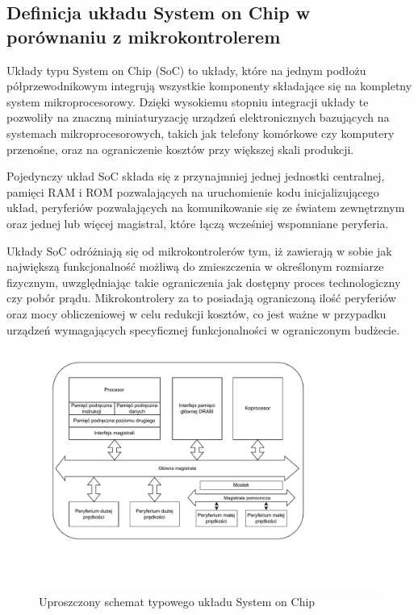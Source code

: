 
\subsection{Definicja układu System on Chip w porównaniu z mikrokontrolerem}

Układy typu System on Chip (SoC) to układy, które na jednym podłożu półprzewodnikowym integrują wszystkie komponenty składające się na kompletny system mikroprocesorowy. Dzięki wysokiemu stopniu integracji układy te pozwoliły na znaczną miniaturyzację urządzeń elektronicznych bazujących na systemach mikroprocesorowych, takich jak telefony komórkowe czy komputery przenośne, oraz na ograniczenie kosztów przy większej skali produkcji.

Pojedynczy układ SoC składa się z przynajmniej jednej jednostki centralnej, pamięci RAM i ROM pozwalających na uruchomienie kodu inicjalizującego układ, peryferiów pozwalających na komunikowanie się ze światem zewnętrznym oraz jednej lub więcej magistral, które łączą wcześniej wspomniane peryferia.

Układy SoC odróżniają się od mikrokontrolerów tym, iż zawierają w sobie jak największą funkcjonalność możliwą do zmieszczenia w określonym rozmiarze fizycznym, uwzględniając takie ograniczenia jak dostępny proces technologiczny czy pobór prądu. Mikrokontrolery za to posiadają ograniczoną ilość peryferiów oraz mocy obliczeniowej w celu redukcji kosztów, co jest ważne w przypadku urządzeń wymagających specyficznej funkcjonalności w ograniczonym budżecie.

\begin{figure}[H]
\centering
\includegraphics[scale=0.7,trim={0 3cm 3cm 0.3cm},clip]{soc-theory/diag-soc-schem.pdf}
\caption{Uproszczony schemat typowego układu System on Chip}
\label{fig:soc-schem}
\end{figure}

